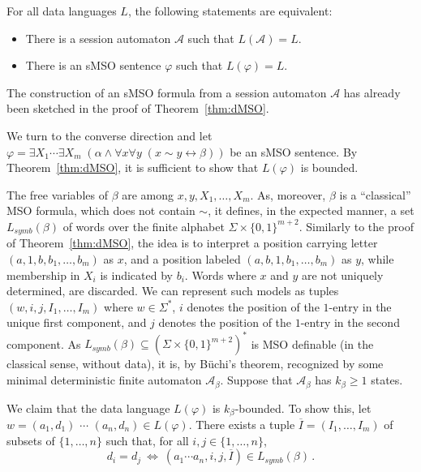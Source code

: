 \documentclass{LMCS}
\newcommand{\set}[1]{\{1,\ldots,#1\}}
\def\A{\mathcal A}
\newcommand{\symbL}{L_\mathit{symb}}
\renewcommand{\phi}{\varphi}
\newcommand{\runf}{\alpha}
\newcommand{\dataf}{\beta}
\newcommand{\kphi}{k_\dataf}
\newcommand{\tupleI}{\overline{I}}
\begin{document}
\begin{thm}\label{thm:logic}
  For all data languages $L$, the following statements are
  equivalent:
  \begin{itemize}
  \item There is a session automaton $\A$ such that $L(\A) = L$.
  \item There is an sMSO sentence $\phi$ such that $L(\phi) = L$.
  \end{itemize}
\end{thm}

\proof The construction of an sMSO formula from a session automaton
$\A$ has already been sketched in the proof of Theorem~\ref{thm:dMSO}.

We turn to the converse direction and let $\phi = \exists X_1 \cdots
\exists X_m\;(\runf \mathrel{\wedge} \forall x\forall y\;(x \sim y
\leftrightarrow \dataf))$ be an sMSO sentence. By
Theorem~\ref{thm:dMSO}, it is sufficient to show that $L(\phi)$ is
bounded.

The free variables of $\dataf$ are among $x,y,X_1,\ldots,X_m$. As,
moreover, $\dataf$ is a ``classical'' MSO formula, which does not
contain $\sim$,
it defines, in the expected manner, a set $\symbL(\dataf)$ of words
over the finite alphabet $\Sigma \times \{0,1\}^{m+2}$.  Similarly to
the proof of Theorem~\ref{thm:dMSO}, the idea is to interpret a
position carrying letter $(a,1,b,b_1,\ldots,b_m)$ as $x$, and a
position labeled $(a,b,1,b_1,\ldots,b_m)$ as $y$, while membership in
$X_i$ is indicated by $b_i$. Words where $x$ and $y$ are not uniquely
determined, are discarded. We can represent such models as tuples
$(w,i,j,I_1,\ldots,I_m)$ where $w \in \Sigma^\ast$, $i$ denotes the
position of the $1$-entry in the unique first component, and $j$
denotes the position of the $1$-entry in the second component.
As $\symbL(\dataf) \subseteq (\Sigma \times \{0,1\}^{m+2})^\ast$ is
MSO definable (in the classical sense, without data), it is, by
B{\"u}chi's theorem, recognized by some minimal deterministic finite
automaton $\A_\dataf$. Suppose that $\A_\dataf$ has $\kphi \ge 1$
states.

We claim that the data language $L(\phi)$ is $\kphi$-bounded.
To show this, let $w = (a_1,d_1)$ $\cdots$ $(a_n,d_n) \in L(\phi)$.
There exists a tuple $\tupleI =(I_1,\ldots,I_m)$ of subsets of
$\set{n}$ such that, for all $i,j \in \set{n}$, \[d_i = d_j
~\Longleftrightarrow~ (a_1 \cdots a_n,i,j,\tupleI) \in
\symbL(\dataf)\,.\tag{$\ast$}\label{lab:deq}\]
\end{document}

